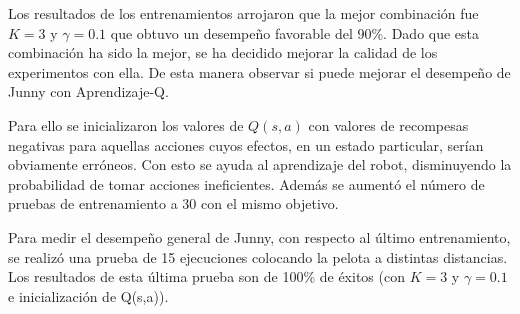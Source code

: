 %
%
%
%

Los resultados de los entrenamientos arrojaron que la mejor combinaci\'on fue $K = 3$ y $ \gamma = 0.1 $ que obtuvo un desempeño favorable del 90\%. Dado que esta combinación ha sido la mejor, se ha decidido mejorar la calidad de los experimentos con ella. De esta manera observar si puede mejorar el desempeño de Junny con Aprendizaje-Q.

Para ello se inicializaron los valores de $Q(s,a)$ con valores de recompesas negativas para aquellas acciones cuyos efectos, en un estado particular, serían obviamente err\'oneos. Con esto se ayuda al aprendizaje del robot, disminuyendo la probabilidad de tomar acciones ineficientes. Adem\'as se aumentó el n\'umero de pruebas de entrenamiento a 30 con el mismo objetivo.

Para medir el desempeño general de Junny, con respecto al último entrenamiento, se realizó una prueba de 15 ejecuciones colocando la pelota a distintas distancias. Los resultados de esta \'ultima prueba  son de 100\% de éxitos (con $K = 3$ y $ \gamma = 0.1 $ e inicializaci\'on de Q(s,a)). %
%

